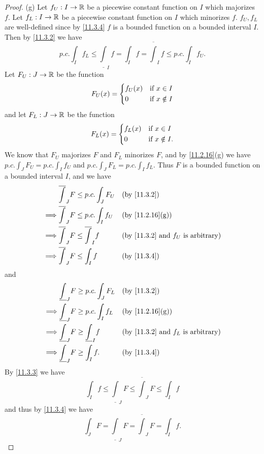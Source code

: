 \begin{proof}{(g)}
  Let \(f_U : I \to \mathbb{R}\) be a piecewise constant function on \(I\) which majorizes \(f\).
  Let \(f_L : I \to \mathbb{R}\) be a piecewise constant function on \(I\) which minorizes \(f\).
  \(f_U, f_L\) are well-defined since by \cref{11.3.4} \(f\) is a bounded function on a bounded interval \(I\).
  Then by \cref{11.3.2} we have
  \[
    p.c. \int_I f_L \leq \underline{\int}_I f = \int_I f = \overline{\int}_I f \leq p.c. \int_I f_U.
  \]
  Let \(F_U : J \to \mathbb{R}\) be the function
  \[
    F_U(x) = \begin{dcases}
      f_U(x) & \text{if } x \in I    \\
      0      & \text{if } x \notin I
    \end{dcases}
  \]
  and let \(F_L : J \to \mathbb{R}\) be the function
  \[
    F_L(x) = \begin{dcases}
      f_L(x) & \text{if } x \in I     \\
      0      & \text{if } x \notin I.
    \end{dcases}
  \]
  We know that \(F_U\) majorizes \(F\) and \(F_L\) minorizes \(F\), and by \cref{11.2.16}(g) we have \(p.c. \int_J F_U = p.c. \int_I f_U\) and \(p.c. \int_J F_L = p.c. \int_I f_L\).
  Thus \(F\) is a bounded function on a bounded interval \(I\), and we have
  \begin{align*}
             & \overline{\int}_J F \leq p.c. \int_J F_U     &  & \by{11.3.2}                                        \\
    \implies & \overline{\int}_J F \leq p.c. \int_I f_U     &  & \text{(by \cref{11.2.16}(g))}                      \\
    \implies & \overline{\int}_J F \leq \overline{\int}_I f &  & \text{(by \cref{11.3.2} and \(f_U\) is arbitrary)} \\
    \implies & \overline{\int}_J F \leq \int_I f            &  & \by{11.3.4}
  \end{align*}
  and
  \begin{align*}
             & \underline{\int}_J F \geq p.c. \int_J F_L      &  & \by{11.3.2}                                        \\
    \implies & \underline{\int}_J F \geq p.c. \int_I f_L      &  & \text{(by \cref{11.2.16}(g))}                      \\
    \implies & \underline{\int}_J F \geq \underline{\int}_I f &  & \text{(by \cref{11.3.2} and \(f_L\) is arbitrary)} \\
    \implies & \underline{\int}_J F \geq \int_I f.            &  & \by{11.3.4}
  \end{align*}
  By \cref{11.3.3} we have
  \[
    \int_I f \leq \underline{\int}_J F \leq \overline{\int}_J F \leq \int_I f
  \]
  and thus by \cref{11.3.4} we have
  \[
    \int_J F = \underline{\int}_J F = \overline{\int}_J F = \int_I f.
  \]
\end{proof}

